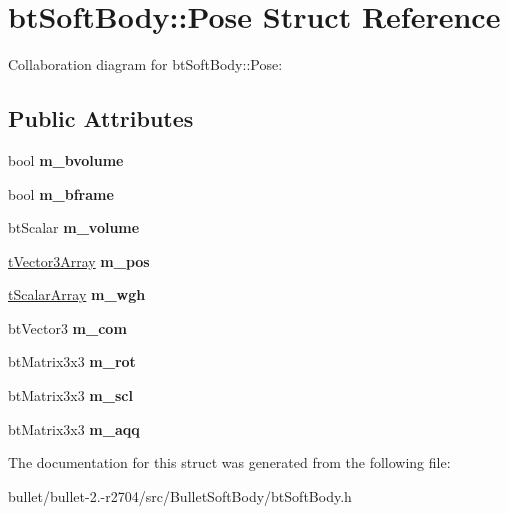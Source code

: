 \hypertarget{structbt_soft_body_1_1_pose}{\section{bt\+Soft\+Body\+:\+:Pose Struct Reference}
\label{structbt_soft_body_1_1_pose}
}


Collaboration diagram for bt\+Soft\+Body\+:\+:Pose\+:
\subsection*{Public Attributes}
\begin{DoxyCompactItemize}
\item 
\hypertarget{structbt_soft_body_1_1_pose_a359673dbb1d50f586ae6e77924e9d8ac}{bool {\bfseries m\+\_\+bvolume}}\label{structbt_soft_body_1_1_pose_a359673dbb1d50f586ae6e77924e9d8ac}

\item 
\hypertarget{structbt_soft_body_1_1_pose_adf09c94d97fb44f3b88c3b1832776766}{bool {\bfseries m\+\_\+bframe}}\label{structbt_soft_body_1_1_pose_adf09c94d97fb44f3b88c3b1832776766}

\item 
\hypertarget{structbt_soft_body_1_1_pose_a4806127851c12e3df29b1097aa3723c9}{bt\+Scalar {\bfseries m\+\_\+volume}}\label{structbt_soft_body_1_1_pose_a4806127851c12e3df29b1097aa3723c9}

\item 
\hypertarget{structbt_soft_body_1_1_pose_aa6cae81e27e3a4c8990423f2fa6bf182}{\hyperlink{classbt_aligned_object_array}{t\+Vector3\+Array} {\bfseries m\+\_\+pos}}\label{structbt_soft_body_1_1_pose_aa6cae81e27e3a4c8990423f2fa6bf182}

\item 
\hypertarget{structbt_soft_body_1_1_pose_ad734471e031d5105259ebab2f9de71c9}{\hyperlink{classbt_aligned_object_array}{t\+Scalar\+Array} {\bfseries m\+\_\+wgh}}\label{structbt_soft_body_1_1_pose_ad734471e031d5105259ebab2f9de71c9}

\item 
\hypertarget{structbt_soft_body_1_1_pose_a5083f27c5671f4ff377a6ee4d601ec6e}{bt\+Vector3 {\bfseries m\+\_\+com}}\label{structbt_soft_body_1_1_pose_a5083f27c5671f4ff377a6ee4d601ec6e}

\item 
\hypertarget{structbt_soft_body_1_1_pose_ac84ae4951c58adeee86b8e6113f2e2d2}{bt\+Matrix3x3 {\bfseries m\+\_\+rot}}\label{structbt_soft_body_1_1_pose_ac84ae4951c58adeee86b8e6113f2e2d2}

\item 
\hypertarget{structbt_soft_body_1_1_pose_a15a4fa7fa548a96678aae8dc8e259d34}{bt\+Matrix3x3 {\bfseries m\+\_\+scl}}\label{structbt_soft_body_1_1_pose_a15a4fa7fa548a96678aae8dc8e259d34}

\item 
\hypertarget{structbt_soft_body_1_1_pose_aade9009495e18ebbaebfdf029fc0fca0}{bt\+Matrix3x3 {\bfseries m\+\_\+aqq}}\label{structbt_soft_body_1_1_pose_aade9009495e18ebbaebfdf029fc0fca0}

\end{DoxyCompactItemize}


The documentation for this struct was generated from the following file\+:\begin{DoxyCompactItemize}
\item 
bullet/bullet-\/2.-\/r2704/src/\+Bullet\+Soft\+Body/bt\+Soft\+Body.\+h\end{DoxyCompactItemize}
